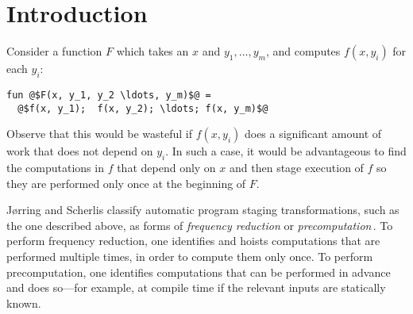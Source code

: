 
\section{Introduction}
\label{sec:intro}


Consider a function $F$ which takes an $x$ and $y_1,\dots,y_m$, and computes
$f(x,y_i)$ for each $y_i$:
\begin{lstlisting}
fun @$F(x, y_1, y_2 \ldots, y_m)$@ = 
  @$f(x, y_1);  f(x, y_2); \ldots; f(x, y_m)$@
\end{lstlisting}
%
Observe that this would be wasteful if $f(x,y_i)$ does a significant 
amount of work that does not depend on $y_i$.
In such a case, it would be advantageous to find the computations in
$f$ that depend only on $x$ and then stage execution of $f$ so they are
performed only once at the beginning of $F$.



J{\o}rring and Scherlis classify automatic program staging
transformations, such as the one described above, as forms of {\em
  frequency reduction} or {\em
  precomputation}\,\cite{JS86-staging}. To perform frequency
reduction, one identifies and hoists computations that are performed
multiple times, in order to compute them only once. To perform
precomputation, one identifies computations that can be performed in
advance and does so---for example, at compile time if the relevant
inputs are statically known.

